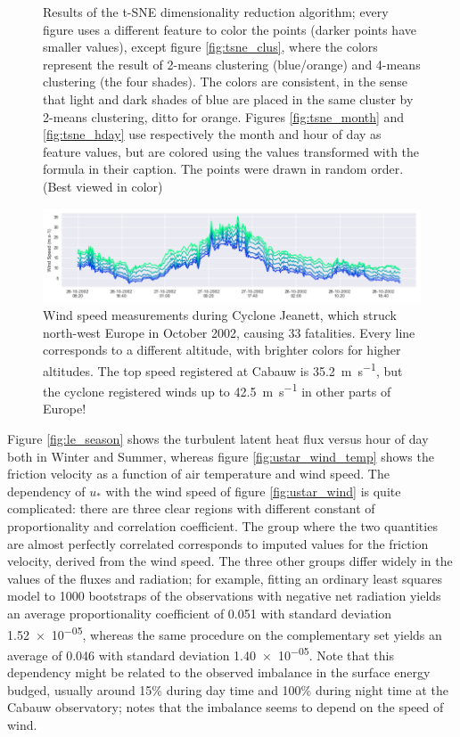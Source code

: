 \documentclass[a4paper,11pt]{kth-mag}
\begin{document}
\begin{figure}
    \caption{Results of the t-SNE dimensionality reduction algorithm; every figure uses a different feature to color the points (darker points have smaller values), except figure \ref{fig:tsne_clus}, where the colors represent the result of 2-means clustering (blue/orange) and 4-means clustering (the four shades). The colors are consistent, in the sense that light and dark shades of blue are placed in the same cluster by 2-means clustering, ditto for orange. Figures \ref{fig:tsne_month} and \ref{fig:tsne_hday} use respectively the month and hour of day as feature values, but are colored using the values transformed with the formula in their caption. The points were drawn in random order. (Best viewed in color)}
	\label{fig:tsne}
\end{figure}


\begin{figure}
    \centering
	\includegraphics[width=\textwidth]{images/cyclone_jeanett}
	\caption{Wind speed measurements during Cyclone Jeanett, which struck north-west Europe in October 2002, causing 33 fatalities. Every line corresponds to a different altitude, with brighter colors for higher altitudes. The top speed registered at Cabauw is \SI{35.2}{\meter\per\second}, but the cyclone registered winds up to \SI{42.5}{\meter\per\second} in other parts of Europe!}
	\label{fig:cyclone_jeanett}
\end{figure}


Figure \ref{fig:le_season} shows the turbulent latent heat flux versus hour of day both in Winter and Summer, whereas figure \ref{fig:ustar_wind_temp} shows the friction velocity as a function of air temperature and wind speed. The dependency of $u_*$ with the wind speed of figure \ref{fig:ustar_wind} is quite complicated: there are three clear regions with different constant of proportionality and correlation coefficient. The group where the two quantities are almost perfectly correlated corresponds to imputed values for the friction velocity, derived from the wind speed. The three other groups differ widely in the values of the fluxes and radiation; for example, fitting an ordinary least squares model to 1000 bootstraps of the observations with negative net radiation yields an average proportionality coefficient of \num{0.051} with standard deviation \num{1.52e-05}, whereas the same procedure on the complementary set yields an average of \num{0.046} with standard deviation \num{1.40e-05}. Note that this dependency might be related to the observed imbalance in the surface energy budged, usually around 15\% during day time and 100\% during night time at the Cabauw observatory; \cite{cabauwinsitu} notes that the imbalance seems to depend on the speed of wind.
\end{document}
